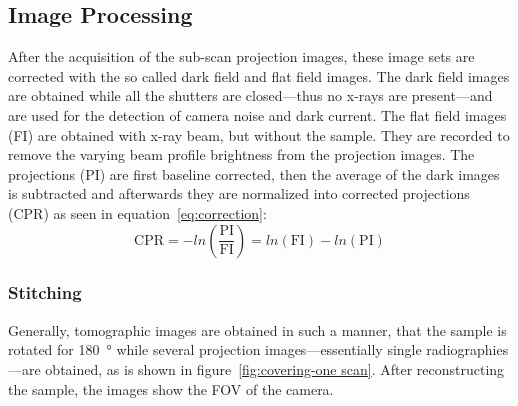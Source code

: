 \subsection{Image Processing}
\label{subsec:image processing}
After the acquisition of the sub-scan projection images, these image sets are corrected with the so called dark field and flat field images. The dark field images are obtained while all the shutters are closed---thus no x-rays are present---and are used for the detection of camera noise and dark current. The flat field images (FI) are obtained with x-ray beam, but without the sample. They are recorded to remove the varying beam profile brightness from the projection images. The projections (PI) are first baseline corrected, then the average of the dark images is subtracted and afterwards they are normalized into corrected projections (CPR) as seen in equation~\ref{eq:correction}:%
\begin{equation}
	\text{CPR}=-ln\left(\frac{\text{PI}}{\text{FI}}\right)=ln(\text{FI})-ln(\text{PI})
	\label{eq:correction}
\end{equation}

\subsubsection{Stitching}
\label{subsec:stitching}
Generally, tomographic images are obtained in such a manner, that the sample is rotated for \SI{180}{\degree} while several projection images---essentially single radiographies---are obtained, as is shown in figure~\ref{fig:covering-one scan}. After reconstructing the sample, the images show the FOV of the camera.

\begin{figure*}[tb]
	\centering
	\subfloat[\SI{180}{\degree}]{\label{subfig:cover180}}\\
	\subfloat[\SI{360}{\degree}]{\label{subfig:cover360}}
	\caption{Covering the FOV -- one scan}
	\label{fig:covering-one scan}
\end{figure*}

\begin{figure*}[tb]
	\centering
		
	\caption{Stacked Scanning - long and thin samples}
	\label{fig:stacked-scanning}
\end{figure*}

\begin{figure*}[tb]
	\centering
		
	\caption{Stacked Scanning - broad samples}
	\label{fig:widefield-scanning}
\end{figure*}


